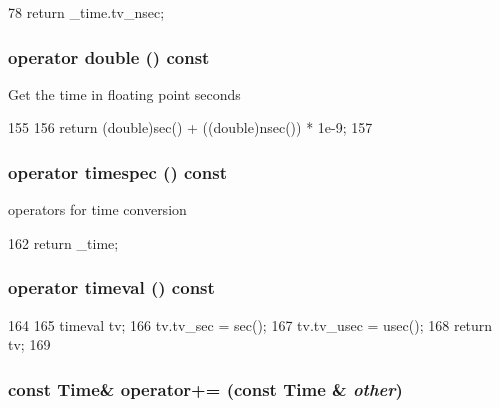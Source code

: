 \begin{DoxyCode}
78 { return _time.tv_nsec; }
\end{DoxyCode}
\hypertarget{classTime_a5665dbc337111463ad23d3dba99f7ce3}{
\subsubsection[{operator double}]{\setlength{\rightskip}{0pt plus 5cm}operator double () const}}
\label{classTime_a5665dbc337111463ad23d3dba99f7ce3}
Get the time in floating point seconds 


\begin{DoxyCode}
155     {
156         return (double)sec() + ((double)nsec()) * 1e-9;
157     }
\end{DoxyCode}
\hypertarget{classTime_a7adea83ab904e5791837f80ec8f9d43e}{
\subsubsection[{operator timespec}]{\setlength{\rightskip}{0pt plus 5cm}operator timespec () const}}
\label{classTime_a7adea83ab904e5791837f80ec8f9d43e}
operators for time conversion 


\begin{DoxyCode}
162 { return _time; }
\end{DoxyCode}
\hypertarget{classTime_ae05f06dc99bbbc25e3353503b68b28ed}{
\subsubsection[{operator timeval}]{\setlength{\rightskip}{0pt plus 5cm}operator timeval () const}}
\label{classTime_ae05f06dc99bbbc25e3353503b68b28ed}



\begin{DoxyCode}
164     {
165         timeval tv;
166         tv.tv_sec = sec();
167         tv.tv_usec = usec();
168         return tv;
169     }
\end{DoxyCode}
\hypertarget{classTime_abbcc50aa6a80eb89caebd1adc670a4b4}{
\subsubsection[{operator+=}]{\setlength{\rightskip}{0pt plus 5cm}const {\bf Time}\& operator+= (const {\bf Time} \& {\em other})}}
\label{classTime_abbcc50aa6a80eb89caebd1adc670a4b4}




